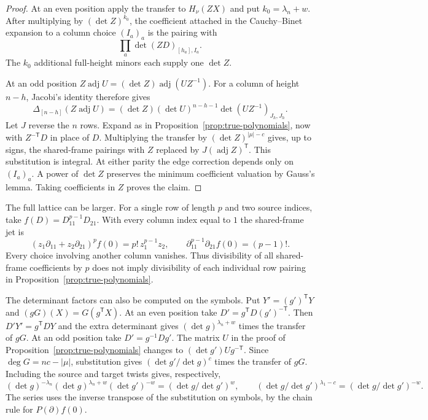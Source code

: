 \begin{proof}
At an even position apply the transfer to $H_\nu(ZX)$ and put $k_0=\lambda_n+w$.
After multiplying by $(\det Z)^{k_0}$, the coefficient attached in the
Cauchy--Binet expansion to a column choice $(I_a)_a$ is the pairing with
\[
             \prod_a\det (ZD)_{[h_a],I_a}.
\]
The $k_0$ additional full-height minors each supply one $\det Z$.

At an odd position $Z\operatorname{adj}U=(\det Z)\operatorname{adj}(UZ^{-1})$.
For a column of height $n-h$, Jacobi's identity therefore gives
\[
 \Delta_{[n-h]}(Z\operatorname{adj}U)
    =(\det Z)(\det U)^{n-h-1}\det (UZ^{-1})_{J_h,J_h}.
\]
Let $J$ reverse the $n$ rows. Expand as in Proposition~\ref{prop:true-polynomials},
now with $Z^{-\mathsf T}D$ in place of $D$. Multiplying the transfer
by $(\det Z)^{|\mu|-c}$ gives, up to signs, the shared-frame pairings
with $Z$ replaced by $J(\operatorname{adj}Z)^{\mathsf T}$.
This substitution is integral. At either parity the edge correction depends
only on $(I_a)_a$. A power of $\det Z$ preserves the minimum coefficient
valuation by Gauss's lemma. Taking coefficients in $Z$ proves the claim.
\end{proof}

The full lattice can be larger. For a single row of length $p$ and
two source indices, take $f(D)=D_{11}^{p-1}D_{21}$. With every column
index equal to $1$ the shared-frame jet is
\[
 (z_1\partial_{11}+z_2\partial_{21})^p f(0)
     =p!\,z_1^{p-1}z_2,\qquad
 \partial_{11}^{p-1}\partial_{21} f(0)=(p-1)! .
\]
Every choice involving another column vanishes. Thus divisibility of
all shared-frame coefficients by $p$ does not imply divisibility of
each individual row pairing in Proposition~\ref{prop:true-polynomials}.

The determinant factors can also be computed on the symbols. Put
$Y'=(g')^{\mathsf T}Y$ and $(gG)(X)=G(g^{\mathsf T}X)$. At an even
position take $D'=g^{\mathsf T}D(g')^{-\mathsf T}$. Then
$D'Y'=g^{\mathsf T}DY$ and the extra determinant gives
$(\det g)^{\lambda_n+w}$ times the transfer of $gG$.
At an odd position take $D'=g^{-1}Dg'$. The matrix $U$ in the proof
of Proposition~\ref{prop:true-polynomials} changes to
$(\det g')U g^{-\mathsf T}$. Since $\deg G=nc-|\mu|$, substitution
gives $(\det g'/\det g)^c$ times the transfer of $gG$.
Including the source and target twists gives, respectively,
\[
 (\det g)^{-\lambda_n}(\det g)^{\lambda_n+w}(\det g')^{-w}
      =(\det g/\det g')^w,\qquad
 (\det g/\det g')^{\lambda_1-c}=(\det g/\det g')^{-w}.
\]
The series uses the inverse transpose of the substitution on symbols,
by the chain rule for $P(\partial)f(0)$.

